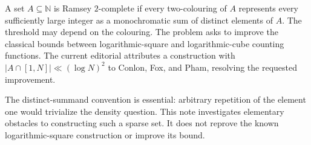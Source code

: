 A set $A\subseteq\mathbb N$ is Ramsey $2$-complete if every two-colouring of $A$ represents every sufficiently large integer as a monochromatic sum of distinct elements of $A$. The threshold may depend on the colouring. The problem asks to improve the classical bounds between logarithmic-square and logarithmic-cube counting functions. The current editorial attributes a construction with $|A\cap[1,N]|\ll(\log N)^2$ to Conlon, Fox, and Pham, resolving the requested improvement.

The distinct-summand convention is essential: arbitrary repetition of the element one would trivialize the density question. This note investigates elementary obstacles to constructing such a sparse set. It does not reprove the known logarithmic-square construction or improve its bound.
